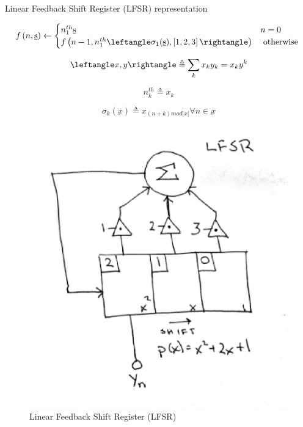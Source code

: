 Linear Feedback Shift Register (LFSR) representation
\newline

\begin{equation}
f\left(n,\underbar{s}\right)
\leftarrow
\begin{cases}
n^{th}_1 \underbar{s} & n = 0 \\
f\left( n-1, n^{th}_1 \leftangle \sigma_{1}(\underbar{s}), \left[ 1,2,3 \right] \rightangle \right) & \mbox{ otherwise }
\end{cases}
\label{eq:lfsr_def}
\end{equation}

\begin{equation}
\leftangle x, y \rightangle
\triangleq
\sum_{k} x_k y_k 
= x_k y^k
\label{eq:dotprod}
\end{equation}

\begin{equation}
n^{th}_k
\triangleq
x_k
\label{eq:nth}
\end{equation}

\begin{equation}
\sigma_k \left( \underbar{x} \right)
\triangleq
x_{\left( n + k \right) mod |x|} \forall n \in \underbar{x}
\label{eq:rotate}
\end{equation}

\begin{figure}[H]
\begin{center}
\includegraphics{./figures/lfsr-2.eps}
\end{center}
\caption{Linear Feedback Shift Register (LFSR)}
\label{fig:lfsr}
\end{figure}

